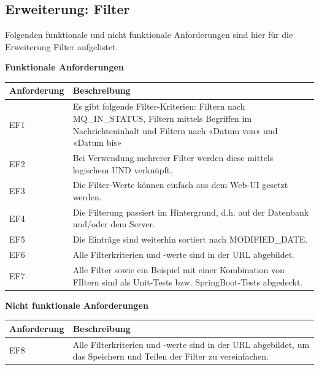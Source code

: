 \subsection{Erweiterung: Filter}
Folgenden funktionale und nicht funktionale Anforderungen sind hier für die Erweiterung Filter aufgelistet.

\textbf{Funktionale Anforderungen}\newline

\noindent \begin{tabular}{|p{3cm}|p{12cm}|}
	\hline
	\textbf{Anforderung}  & \textbf{Beschreibung} \\ \hline
	EF1    & Es gibt folgende Filter-Kriterien: Filtern nach MQ\_IN\_STATUS, Filtern mittels Begriffen im Nachrichteninhalt und Filtern nach «Datum von» und «Datum bis»     \\ \hline
	EF2    & Bei Verwendung mehrerer Filter werden diese mittels logischem UND verknüpft.     \\ \hline
	EF3    & Die Filter-Werte können einfach aus dem Web-UI gesetzt werden.     \\ \hline
	EF4    & Die Filterung passiert im Hintergrund, d.h. auf der Datenbank und/oder dem Server.     \\ \hline
	EF5    & Die Einträge sind weiterhin sortiert nach MODIFIED\_DATE.     \\ \hline
	EF6    & Alle Filterkriterien und -werte sind in der URL abgebildet.     \\ \hline
	EF7    & Alle Filter sowie ein Beispiel mit einer Kombination von FIltern sind als Unit-Tests bzw. SpringBoot-Tests abgedeckt.     \\ \hline
\end{tabular}\newline

\newpage
\noindent \textbf{Nicht funktionale Anforderungen}\newline

\noindent \begin{tabular}{|p{3cm}|p{12cm}|}
	\hline
	\textbf{Anforderung}  & \textbf{Beschreibung} \\ \hline
	EF8    & Alle Filterkriterien und -werte sind in der URL abgebildet, um das Speichern und Teilen der Filter zu vereinfachen.     \\ \hline
\end{tabular}

\newpage